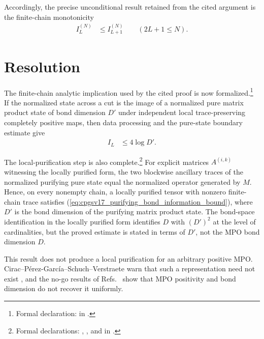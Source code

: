 \documentclass[11pt]{article}
\begin{document}
Accordingly, the precise unconditional result retained from the cited argument
is the finite-chain monotonicity
\begin{align}
    I_L^{(N)}
        &\leq I_{L+1}^{(N)}
        \qquad
        (2L+1\leq N).
    \label{eq:cpgsv17_unconditional_finite_chain_monotonicity}
\end{align}

\section{Resolution}

The finite-chain analytic implication used by the cited proof is now
formalized.\footnote{Formal declaration:
 in
.}
If the normalized state across a cut is the image of a normalized pure matrix
product state of bond dimension $D'$ under independent local
trace-preserving completely positive maps, then data processing and the
pure-state boundary estimate give
\begin{align}
    I_L
        &\leq 4\log D'.
    \label{eq:cpgsv17_purifying_bond_information_bound}
\end{align}

The local-purification step is also complete.\footnote{Formal declarations:
,
, and
 in
.}
For explicit matrices $A^{(i,k)}$ witnessing the locally purified form, the
two blockwise ancillary traces of the normalized purifying pure state equal the
normalized operator generated by $M$. Hence, on every nonempty chain, a
locally purified tensor with nonzero finite-chain trace satisfies
(\ref{eq:cpgsv17_purifying_bond_information_bound}), where $D'$ is the bond
dimension of the purifying matrix product state. The bond-space identification
in the locally purified form identifies $D$ with $(D')^2$ at the level of
cardinalities, but the proved estimate is stated in terms of $D'$, not the MPO
bond dimension $D$.

This result does not produce a local purification for an arbitrary positive
MPO. Cirac--P\'erez-Garc\'ia--Schuch--Verstraete warn that such a
representation need not exist \cite{Cirac2016MPDO_arXiv}, and the no-go
results of
Refs.~\cite{DeLasCuevas2013Purifications,DeLasCuevas2016Fundamental} show that
MPO positivity and bond dimension do not recover it uniformly.
\end{document}
